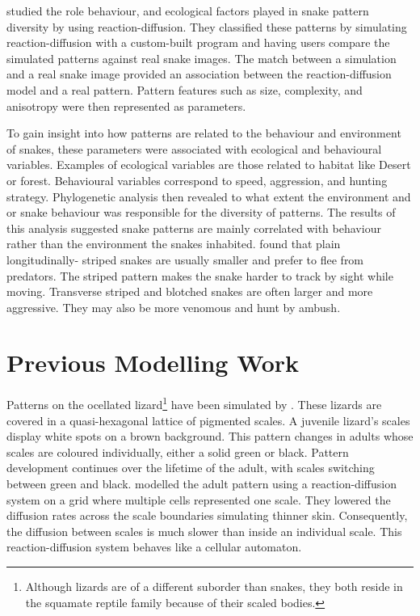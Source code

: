 \citet{allen2013} studied the role behaviour, and ecological factors played in snake pattern diversity by using reaction-diffusion. They classified these patterns by simulating reaction-diffusion with a custom-built program and having users compare the simulated patterns against real snake images. The match between a simulation and a real snake image provided an association between the reaction-diffusion model and a real pattern. Pattern features such as size, complexity, and anisotropy were then represented as parameters.

To gain insight into how patterns are related to the behaviour and environment of snakes, these parameters were associated with ecological and behavioural variables. Examples of ecological variables are those related to habitat like Desert or forest. Behavioural variables correspond to speed, aggression, and hunting strategy. Phylogenetic analysis then revealed to what extent the environment and or snake behaviour was responsible for the diversity of patterns. The results of this analysis suggested snake patterns are mainly correlated with behaviour rather than the environment the snakes inhabited. \citet{allen2013} found that plain longitudinally- striped snakes are usually smaller and prefer to flee from predators. The striped pattern makes the snake harder to track by sight while moving. Transverse striped and blotched snakes are often larger and more aggressive. They may also be more venomous and hunt by ambush.

\section{Previous Modelling Work}
Patterns on the ocellated lizard\footnote{Although lizards are of a different suborder than snakes, they both reside in the squamate reptile family because of their scaled bodies.} have been simulated by \citet{manukyan2017}. These lizards are covered in a quasi-hexagonal lattice of pigmented scales. A juvenile lizard's scales display white spots on a brown background. This pattern changes in adults whose scales are coloured individually, either a solid green or black. Pattern development continues over the lifetime of the adult, with scales switching between green and black. \citet{manukyan2017} modelled the adult pattern using a reaction-diffusion system on a grid where multiple cells represented one scale. They lowered the diffusion rates across the scale boundaries simulating thinner skin. Consequently, the diffusion between scales is much slower than inside an individual scale. This reaction-diffusion system behaves like a cellular automaton.

